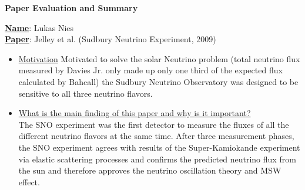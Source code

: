 \documentclass[12pt]{article}
\begin{document}
	\noindent
	\begin{center}
		\centering
		\Large{\textbf{Paper Evaluation and Summary}}
	\end{center}
	\textbf{\underline{Name}}: Lukas Nies \\
	\noindent
	\textbf{\underline{Paper}}: Jelley et al. (Sudbury Neutrino Experiment, 2009) \\[0.5cm] 
	\noindent
	\begin{itemize}
		\item \ul{Motivation}
		\noindent
		Motivated to solve the solar Neutrino problem (total neutrino flux measured by Davies Jr. only made up only one third of the expected flux calculated by Bahcall) the Sudbury Neutrino Observatory was designed to be sensitive to all three neutrino flavors.
		
		\item \ul{What is the main finding of this paper and why is it important?} \\
		\noindent
		The SNO experiment was the first detector to measure the fluxes of all the different neutrino flavors at the same time. After three measurement phases, the SNO experiment agrees with results of the Super-Kamiokande experiment via elastic scattering processes and confirms the predicted neutrino flux from the sun and therefore approves the neutrino oscillation theory and MSW effect. 
		

\end{itemize}
\end{document}
